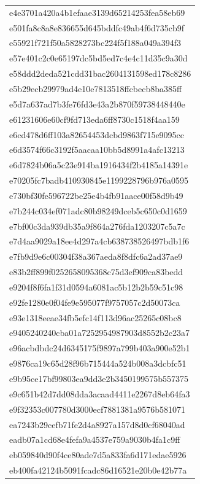 \begin{tabular}{l}
e4e3701a420a4b1efaae3139d65214253fea58eb69 \\
e501fa8c8a8e836655d645bddfc49ab4f6d735cb9f \\
e55921f721f50a5828273bc224f5f188a049a394f3 \\
e57e401c2c0e65197dc5bd5ed7c4e4c11d35c9a30d \\
e58ddd2deda521cdd31bac2604131598ed178c8286 \\
e5b29ecb29979ad4e10e7813518ffcbecb8ba385ff \\
e5d7a637ad7b3fe76fd3e43a2b870f59738448440e \\
e61231606e60cf9fd713eda6ff8730c1518f4aa159 \\
e6cd478d6ff103a82654453dcbd9863f715e9095cc \\
e6d3574f66c3192f5aacaa10bb5d8991a4afc13213 \\
e6d7824b06a5c23e914ba1916434f2b4185a14391e \\
e70205fc7badb410930845e1199228796b976a0595 \\
e730bf30fe596722be25e4b4fb91aace00f58d9b49 \\
e7b244c034ef071adc80b98249dceb5c650c0d1659 \\
e7bf00c3da939db35a9f864a276fda1203207c5a7c \\
e7d4aa9029a18ee4d297a4cb638738526497bdb1f6 \\
e7fb9d9e6c00304f38a367aeda8f8dfc6a2ad37ae9 \\
e83b2ff899f0252658095368c75d3ef909ca83bedd \\
e9204f8f6fa1f31d0594a6081ac5b12b2b59c51c98 \\
e92fe1280e0f04fe9e595077f9757057c2d50073ca \\
e93e1318eeae34fb5efc14f113d96ac25265c08bc8 \\
e9405240240cba01a7252954987903d8552b2c23a7 \\
e96acbdbdc24d6345175f9897a799b403a900e52b1 \\
e9876ca19c65d28f96b715444a524b008a3dcbfc51 \\
e9b95ce17bf99803ea9dd3e2b3450199575b557375 \\
e9c651b42d7dd08dda3acaad4411e2267d8eb64fa3 \\
e9f32353c007780d3000ecf7881381a9576b581071 \\
ea7243b29cefb71fe2d4a8927a157d8d0cf68040ad \\
eadb07a1cd68e4fefa9a4537e759a9030b4fa1c9ff \\
eb059840d90f4ce80ade7d5a833fa6d171edae5926 \\
eb400fa42124b5091fcadc86d16521e20b0e42b77a \\

\end{tabular}
